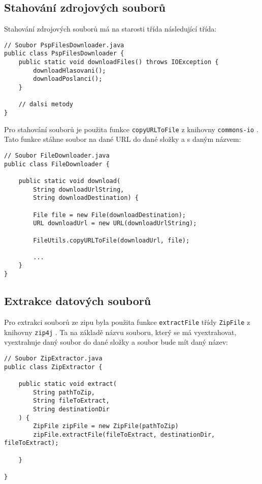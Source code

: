 \subsection*{Stahování zdrojových souborů}
Stahování zdrojových souborů má na starosti třída následující třída:

\begin{lstlisting}[caption={Třída pro stahování zdrojových souborů}, label={lst:psp-downloader}, tabsize=2]
// Soubor PspFilesDownloader.java
public class PspFilesDownloader {
	public static void downloadFiles() throws IOException {
		downloadHlasovani();
		downloadPoslanci();
	}

	// dalsi metody
}
\end{lstlisting}

\noindent Pro stahování souborů je použita funkce \lstinline|copyURLToFile| z knihovny \lstinline|commons-io| \cite{commons-io}. Tato funkce stáhne soubor na dané URL do dané složky a s daným názvem:

\newpage

\begin{lstlisting}[caption={Ukázka stahování dat pomocí knihovny \lstinline|commons-io|}, label={lst:common-io-downloader}, tabsize=2]
// Soubor FileDownloader.java
public class FileDownloader {
	
	public static void download(
		String downloadUrlString, 
		String downloadDestination) {
		
		File file = new File(downloadDestination);
		URL downloadUrl = new URL(downloadUrlString);
		
		FileUtils.copyURLToFile(downloadUrl, file);
	
		...
	}
}
\end{lstlisting}

\subsection*{Extrakce datových souborů}
Pro extrakci souborů ze zipu byla použita funkce \lstinline|extractFile| třídy \lstinline|ZipFile| z knihovny \lstinline|zip4j| \cite{zip4j}. Ta na základě názvu souboru, který se má vyextrahovat, vyextrahuje daný soubor do dané složky a soubor bude mít daný název:

\begin{lstlisting}[caption={Ukázka extrakce souborů ze zipu}, label={lst:zip4j}, tabsize=2]
// Soubor ZipExtractor.java
public class ZipExtractor {

	public static void extract(
		String pathToZip, 
		String fileToExtract, 
		String destinationDir
	) {
		ZipFile zipFile = new ZipFile(pathToZip)
		zipFile.extractFile(fileToExtract, destinationDir, fileToExtract);
		
	}
		
}
\end{lstlisting}

